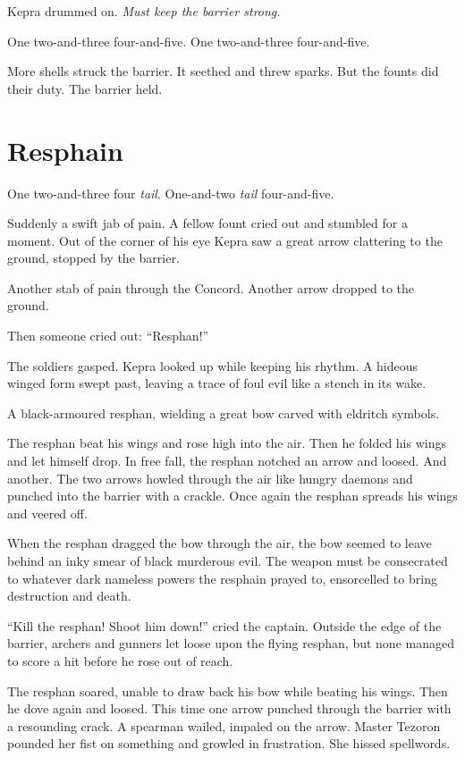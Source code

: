 \documentclass
  [a4paper,
   12pt,
   oneside
  ]%
  {article}
\newcommand{\drum}[1]{\textsf{#1}}
\begin{document}
Kepra drummed on. 
\emph{Must keep the barrier strong.}

\drum{One two-and-three four-and-five. One two-and-three four-and-five.}

More shells struck the barrier. It seethed and threw sparks. But the founts did their duty. The barrier held.



\section{Resphain}
\drum{One two-and-three four \emph{tail}. One-and-two \emph{tail} four-and-five.}\nopagebreak

Suddenly a swift jab of pain. A fellow fount cried out and stumbled for a moment. Out of the corner of his eye Kepra saw a great arrow clattering to the ground, stopped by the barrier.

Another stab of pain through the Concord. 
Another arrow dropped to the ground.

Then someone cried out: ``Resphan!''

The soldiers gasped. Kepra looked up while keeping his rhythm. A hideous winged form swept past, leaving a trace of foul evil like a stench in its wake. 

A black-armoured resphan, wielding a great bow carved with eldritch symbols. 

The resphan beat his wings and rose high into the air. Then he folded his wings and let himself drop. In free fall, the resphan notched an arrow and loosed. And another. The two arrows howled through the air like hungry daemons and punched into the barrier with a crackle. Once again the resphan spreads his wings and veered off.

When the resphan dragged the bow through the air, the bow seemed to leave behind an inky smear of black murderous evil. 
The weapon must be consecrated to whatever dark nameless powers the resphain prayed to, ensorcelled to bring destruction and death.

``Kill the resphan! Shoot him down!'' cried the captain. Outside the edge of the barrier, archers and gunners let loose upon the flying resphan, but none managed to score a hit before he rose out of reach. 

The resphan soared, unable to draw back his bow while beating his wings. 
Then he dove again and loosed. This time one arrow punched through the barrier with a resounding crack. 
A spearman wailed, impaled on the arrow. Master Tezoron pounded her fist on something and growled in frustration. She hissed spellwords. 
\end{document}
